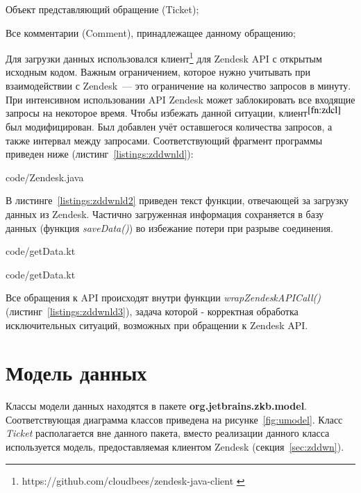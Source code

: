 \begin{enumerate*}
\item Объект представляющий обращение (Ticket);
\item Все комментарии (Comment), принадлежащее данному обращению;
\end{enumerate*}

Для загрузки данных использовался клиент\footnote{https://github.com/cloudbees/zendesk-java-client \label{fn:zdcl}} для Zendesk API с открытым исходным кодом. Важным ограничением, которое нужно учитывать при взаимодействии с Zendesk~--- это ограничение на количество запросов в минуту. При интенсивном использовании API Zendesk может заблокировать все входящие запросы на некоторое время. Чтобы избежать данной ситуации, клиент$^{\ref{fn:zdcl}}$ был модифицирован. Был добавлен учёт оставшегося количества запросов, а также интервал между запросами. Соответствующий фрагмент программы приведен ниже (листинг~\ref{listings:zddwnld}):


{code/Zendesk.java}

В листинге~\ref{listings:zddwnld2} приведен текст функции, отвечающей за загрузку данных из Zendesk. Частично загруженная информация сохраняется в базу данных (функция \textit{saveData()}) во избежание потери при разрыве соединения.


{code/getData.kt}


{code/getData.kt}

Все обращения к API происходят внутри функции \textit{wrapZendeskAPICall()} (листинг~\ref{listings:zddwnld3}), задача которой - корректная обработка исключительных ситуаций, возможных при обращении к Zendesk API.

\section{Модель данных}

Классы модели данных находятся в пакете \textbf{org.jetbrains.zkb.model}. Соответствующая диаграмма классов приведена на рисунке~\ref{fig:umodel}. Класс \textit{Ticket} располагается вне данного пакета, вместо реализации данного класса используется модель, предоставляемая клиентом Zendesk (секция~\ref{sec:zddwn}).

